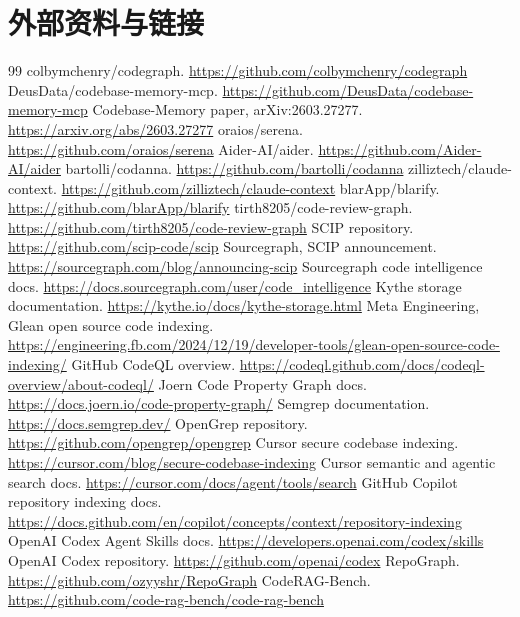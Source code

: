 \documentclass[11pt,a4paper]{article}
\begin{document}
\section{外部资料与链接}

\begin{thebibliography}{99}
 colbymchenry/codegraph. \url{https://github.com/colbymchenry/codegraph}
 DeusData/codebase-memory-mcp. \url{https://github.com/DeusData/codebase-memory-mcp}
 Codebase-Memory paper, arXiv:2603.27277. \url{https://arxiv.org/abs/2603.27277}
 oraios/serena. \url{https://github.com/oraios/serena}
 Aider-AI/aider. \url{https://github.com/Aider-AI/aider}
 bartolli/codanna. \url{https://github.com/bartolli/codanna}
 zilliztech/claude-context. \url{https://github.com/zilliztech/claude-context}
 blarApp/blarify. \url{https://github.com/blarApp/blarify}
 tirth8205/code-review-graph. \url{https://github.com/tirth8205/code-review-graph}
 SCIP repository. \url{https://github.com/scip-code/scip}
 Sourcegraph, SCIP announcement. \url{https://sourcegraph.com/blog/announcing-scip}
 Sourcegraph code intelligence docs. \url{https://docs.sourcegraph.com/user/code_intelligence}
 Kythe storage documentation. \url{https://kythe.io/docs/kythe-storage.html}
 Meta Engineering, Glean open source code indexing. \url{https://engineering.fb.com/2024/12/19/developer-tools/glean-open-source-code-indexing/}
 GitHub CodeQL overview. \url{https://codeql.github.com/docs/codeql-overview/about-codeql/}
 Joern Code Property Graph docs. \url{https://docs.joern.io/code-property-graph/}
 Semgrep documentation. \url{https://docs.semgrep.dev/}
 OpenGrep repository. \url{https://github.com/opengrep/opengrep}
 Cursor secure codebase indexing. \url{https://cursor.com/blog/secure-codebase-indexing}
 Cursor semantic and agentic search docs. \url{https://cursor.com/docs/agent/tools/search}
 GitHub Copilot repository indexing docs. \url{https://docs.github.com/en/copilot/concepts/context/repository-indexing}
 OpenAI Codex Agent Skills docs. \url{https://developers.openai.com/codex/skills}
 OpenAI Codex repository. \url{https://github.com/openai/codex}
 RepoGraph. \url{https://github.com/ozyyshr/RepoGraph}
 CodeRAG-Bench. \url{https://github.com/code-rag-bench/code-rag-bench}
\end{thebibliography}
\end{document}
